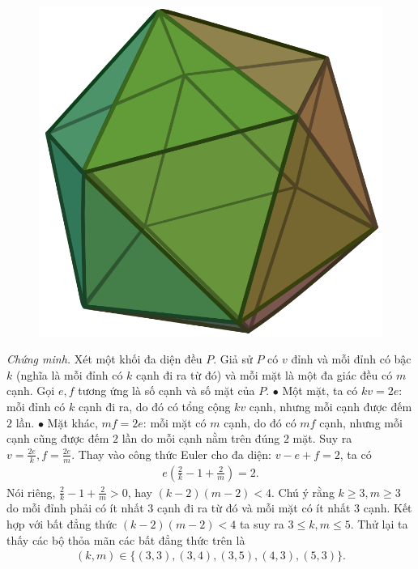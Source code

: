 \begin{multicols}{2}
\begin{figure}[H]
		\includegraphics[scale=0.07]{Icosahedron.png}
		\vspace*{-10pt}
	\end{figure}
	\textit{Chứng minh.} Xét một khối đa diện đều $P$. Giả sử $P$ có $v$ đỉnh và mỗi đỉnh có bậc $k$ (nghĩa là mỗi đỉnh có $k$ cạnh đi ra từ đó) và mỗi mặt là một đa giác đều có $m$ cạnh. Gọi $e, f$ tương ứng là số cạnh và số mặt của $P$. 
	\vskip 0.1cm
	$\bullet$ Một mặt, ta có $kv= 2e$: mỗi đỉnh có $k$ cạnh đi ra, do đó có tổng cộng $kv$ cạnh, nhưng mỗi cạnh được đếm $2$ lần.
	\vskip 0.1cm
	$\bullet$ Mặt khác, $m f=2e$: mỗi mặt có $m$ cạnh, do đó có $mf $ cạnh, nhưng mỗi cạnh cũng được đếm $2$ lần do mỗi cạnh nằm trên đúng $2$ mặt.
	\vskip 0.1cm
	Suy ra $v = \frac{2e}{k}, f = \frac{2e}{m}$. Thay vào công thức Euler cho đa diện: $v-e+f=2$, ta có 
	\begin{align*}
		e\left(\frac{2}{k}-1 + \frac{2}{m}\right)=2.
	\end{align*}	
	Nói riêng, $\frac{2}{k}-1 + \frac{2}{m} >0$, hay $(k-2)(m-2) < 4$.
	\vskip 0.1cm	
	Chú ý rằng $k \geq 3, m \geq 3$ do mỗi đỉnh phải có ít nhất $3$ cạnh đi ra từ đó và mỗi mặt có ít nhất $3$ cạnh. Kết hợp với bất đẳng thức $(k-2)(m-2) < 4$ ta suy ra $3 \leq k, m \leq 5$. Thử lại ta thấy các bộ thỏa mãn các bất đẳng thức trên là 
	\begin{align*}
		\boxed{(k, m)\!\in\! \{\!(3,3), (3, 4), (3, 5), (4, 3), (5, 3)\!\}\!.}

\end{align*}
\end{multicols}
